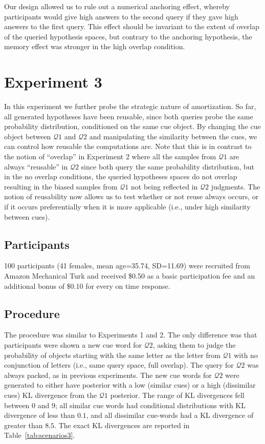 Our design allowed us to rule out a numerical anchoring effect, whereby participants would give high answers to the second query if they gave high answers to the first query. This effect should be invariant to the extent of overlap of the queried hypothesis spaces, but contrary to the anchoring hypothesis, the memory effect was stronger in the high overlap condition.

\section{Experiment 3}

In this experiment we further probe the strategic nature of amortization. So far, all generated hypotheses have been reusable, since both queries probe the same probability distribution, conditioned on the same cue object. By changing the cue object between $\mathcal{Q}1$ and $\mathcal{Q}2$ and manipulating the similarity between the cues, we can control how reusable the computations are. Note that this is in contrast to the notion of ``overlap'' in Experiment 2 where all the samples from $\mathcal{Q}1$ are always ``reusable'' in $\mathcal{Q}2$ since both query the same probability distribution, but in the no overlap conditions, the queried hypotheses spaces do not overlap resulting in the biased samples from $\mathcal{Q}1$ not being reflected in $\mathcal{Q}2$ judgments. The notion of reusability now allows us to test whether or not reuse always occurs, or if it occurs preferentially when it is more applicable (i.e., under high similarity between cues).

\subsection{Participants}

100 participants (41 females, mean age=35.74, SD=11.69) were recruited from Amazon Mechanical Turk and received \$0.50 as a basic participation fee and an additional bonus of \$0.10 for every on time response.

\subsection{Procedure}

The procedure was similar to Experiments 1 and 2. The only difference was that participants were shown a new cue word for $\mathcal{Q}2$, asking them to judge the probability of objects starting with the same letter as the letter from $\mathcal{Q}1$ with no conjunction of letters (i.e., same query space, full overlap). The query for $\mathcal{Q}2$ was always packed, as in previous experiments. The new cue words for $\mathcal{Q}2$ were generated to either have posterior with a low (similar cues) or a high (dissimilar cues) KL divergence from the $\mathcal{Q}1$ posterior. The range of KL divergences fell between $0$ and $9$; all similar cue words had conditional distributions with KL divergence of less than $0.1$, and all dissimilar cue-words had a KL divergence of greater than $8.5$. The exact KL divergences are reported in Table~\ref{tab:scenarios3}.


